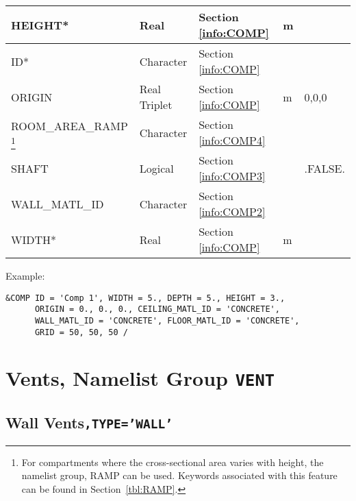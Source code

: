 \begin{minipage}{6.5in}
\begin{longtable}{|l|l|l|l|l@{\extracolsep{\fill}}|}
{\ct HEIGHT}*                & Real     		 & Section \ref{info:COMP}   	          & m         &                 \\ \hline
{\ct ID}*                    & Character		 & Section \ref{info:COMP}                &           &          \\ \hline
{\ct ORIGIN}           & Real Triplet   & Section \ref{info:COMP}                & m         & 0,0,0                \\ \hline
{\ct ROOM\_AREA\_RAMP}
\footnote{For compartments where the cross-sectional area varies with height, the namelist group, {\ct RAMP} can be used. Keywords associated with this feature can be found in Section~\ref{tbl:RAMP}.}
                            & Character          & Section \ref{info:COMP4}                 &           &                 \\ \hline
{\ct SHAFT}                 & Logical  		 & Section \ref{info:COMP3}                 &           & {\ct .FALSE.}   \\ \hline
{\ct WALL\_MATL\_ID}        & Character		 & Section \ref{info:COMP2}                 &           &                 \\ \hline
{\ct WIDTH}*                 & Real               & Section \ref{info:COMP}                  & m         &                 \\ \hline
\end{longtable}
\end{minipage}

\vspace{\baselineskip}
\noindent Example:
\begin{lstlisting}
&COMP ID = 'Comp 1', WIDTH = 5., DEPTH = 5., HEIGHT = 3.,
      ORIGIN = 0., 0., 0., CEILING_MATL_ID = 'CONCRETE',
      WALL_MATL_ID = 'CONCRETE', FLOOR_MATL_ID = 'CONCRETE',
      GRID = 50, 50, 50 /
\end{lstlisting}




\clearpage
\section{Vents, Namelist Group \texorpdfstring{{\tt VENT}}{VENT}}
\label{info:VENT6}

\subsection{Wall Vents\texorpdfstring{{\tt ,TYPE='WALL'}}{, TYPE='WALL'}}

